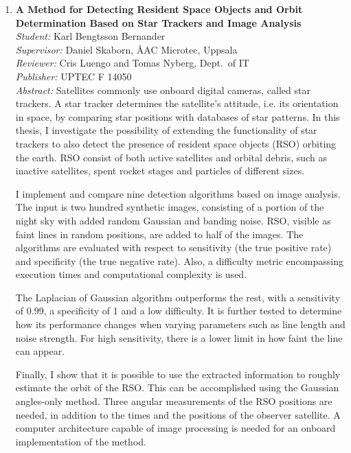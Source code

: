 \begin{small}
\begin{enumerate}
\item\textbf{A Method for Detecting Resident Space Objects and Orbit Determination Based on Star Trackers and Image Analysis}\\
  \emph{Student:} Karl Bengtsson Bernander\\
  \emph{Supervisor:} Daniel Skaborn, {\AA}AC Microtec, Uppsala\\
  \emph{Reviewer:} Cris Luengo and Tomas Nyberg, Dept.~of IT\\
  \emph{Publisher:} UPTEC F 14050 \\
  \emph{Abstract:} Satellites commonly use onboard digital cameras, called star trackers. A star tracker determines the satellite's attitude, i.e. its orientation in space, by comparing star positions with databases of star patterns. In this thesis, I investigate the possibility of extending the functionality of star trackers to also detect the presence of resident space objects (RSO) orbiting the earth. RSO consist of both active satellites and orbital debris, such as inactive satellites, spent rocket stages and particles of different sizes.

I implement and compare nine detection algorithms based on image analysis. The input is two hundred synthetic images, consisting of a portion of the night sky with added random Gaussian and banding noise. RSO, visible as faint lines in random positions, are added to half of the images. The algorithms are evaluated with respect to sensitivity (the true positive rate) and specificity (the true negative rate). Also, a difficulty metric encompassing execution times and computational complexity is used.

The Laplacian of Gaussian algorithm outperforms the rest, with a sensitivity of 0.99, a specificity of 1 and a low difficulty. It is further tested to determine how its performance changes when varying parameters such as line length and noise strength. For high sensitivity, there is a lower limit in how faint the line can appear.

Finally, I show that it is possible to use the extracted information to roughly estimate the orbit of the RSO. This can be accomplished using the Gaussian angles-only method. Three angular measurements of the RSO positions are needed, in addition to the times and the positions of the observer satellite. A computer architecture capable of image processing is needed for an onboard implementation of the method.


\end{enumerate}
\end{small}
